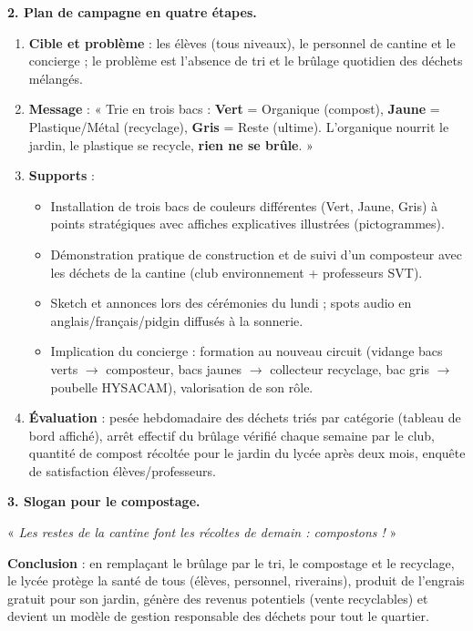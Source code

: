 \documentclass[11pt]{article}
\begin{document}
\begin{exoresolu}
\textbf{2. Plan de campagne en quatre étapes.}
\begin{enumerate}
\item \textbf{Cible et problème} : les élèves (tous niveaux), le personnel de cantine et le concierge ; le problème est l'absence de tri et le brûlage quotidien des déchets mélangés.
\item \textbf{Message} : « Trie en trois bacs : \textbf{Vert} = Organique (compost), \textbf{Jaune} = Plastique/Métal (recyclage), \textbf{Gris} = Reste (ultime). L'organique nourrit le jardin, le plastique se recycle, \textbf{rien ne se brûle}. »
\item \textbf{Supports} :
\begin{itemize}
\item Installation de trois bacs de couleurs différentes (Vert, Jaune, Gris) à points stratégiques avec affiches explicatives illustrées (pictogrammes).
\item Démonstration pratique de construction et de suivi d'un composteur avec les déchets de la cantine (club environnement + professeurs SVT).
\item Sketch et annonces lors des cérémonies du lundi ; spots audio en anglais/français/pidgin diffusés à la sonnerie.
\item Implication du concierge : formation au nouveau circuit (vidange bacs verts $\rightarrow$ composteur, bacs jaunes $\rightarrow$ collecteur recyclage, bac gris $\rightarrow$ poubelle HYSACAM), valorisation de son rôle.
\end{itemize}
\item \textbf{Évaluation} : pesée hebdomadaire des déchets triés par catégorie (tableau de bord affiché), arrêt effectif du brûlage vérifié chaque semaine par le club, quantité de compost récoltée pour le jardin du lycée après deux mois, enquête de satisfaction élèves/professeurs.
\end{enumerate}
\textbf{3. Slogan pour le compostage.}

« \emph{Les restes de la cantine font les récoltes de demain : compostons !} »

\textbf{Conclusion} : en remplaçant le brûlage par le tri, le compostage et le recyclage, le lycée protège la santé de tous (élèves, personnel, riverains), produit de l'engrais gratuit pour son jardin, génère des revenus potentiels (vente recyclables) et devient un modèle de gestion responsable des déchets pour tout le quartier.
\end{exoresolu}
\end{document}
